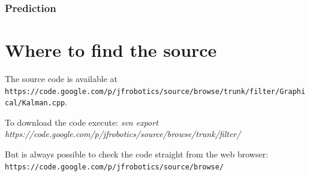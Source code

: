 \documentclass{article}
\begin{document}
\subsubsection{Prediction}

\section{Where to find the source}

The source code is available at \texttt{https://code.google.com/p/jfrobotics/source/browse/trunk/filter/Graphical/Kalman.cpp}.

To download the code execute:
\textit{svn export https://code.google.com/p/jfrobotics/source/browse/trunk/filter/}

But is always possible to check the code straight from the web browser:
\texttt{https://code.google.com/p/jfrobotics/source/browse/}
\end{document}

